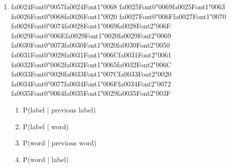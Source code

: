 \documentclass[12pt]{article}
\begin{document}
\begin{enumerate}[label=Q\arabic*.]
\begin{enumerate}[label=(\Alph*)]
    \item It models emissions P(word | label)
\end{enumerate}
\item {\csname fa0024Font0\endcsname\char"0057}{\csname fa0024Font1\endcsname\char"0068} {\csname fa0025Font0\endcsname\char"0069}{\csname fa0025Font1\endcsname\char"0063} {\csname fa0026Font0\endcsname\char"0068}{\csname fa0026Font1\endcsname\char"0020} {\csname fa0027Font0\endcsname\char"006F}{\csname fa0027Font1\endcsname\char"0070} {\csname fa0028Font0\endcsname\char"0074}{\csname fa0028Font1\endcsname\char"0069}{\csname fa0028Font2\endcsname\char"006F} {\csname fa0029Font0\endcsname\char"006E}{\csname fa0029Font1\endcsname\char"0020}{\csname fa0029Font2\endcsname\char"0069} {\csname fa0030Font0\endcsname\char"0073}{\csname fa0030Font1\endcsname\char"0020}{\csname fa0030Font2\endcsname\char"0050} {\csname fa0031Font0\endcsname\char"0028}{\csname fa0031Font1\endcsname\char"006C}{\csname fa0031Font2\endcsname\char"0061} {\csname fa0032Font0\endcsname\char"0062}{\csname fa0032Font1\endcsname\char"0065}{\csname fa0032Font2\endcsname\char"006C} {\csname fa0033Font0\endcsname\char"0020}{\csname fa0033Font1\endcsname\char"007C}{\csname fa0033Font2\endcsname\char"0020} {\csname fa0034Font0\endcsname\char"0077}{\csname fa0034Font1\endcsname\char"006F}{\csname fa0034Font2\endcsname\char"0072} {\csname fa0035Font0\endcsname\char"0064}{\csname fa0035Font1\endcsname\char"0029}{\csname fa0035Font2\endcsname\char"003F}
\begin{enumerate}[label=(\Alph*)]
    \item P(label | previous label)
    \item P(label | word)
    \item P(word | previous word)
    \item P(word | label)
\end{enumerate}

\end{enumerate}
\end{document}
